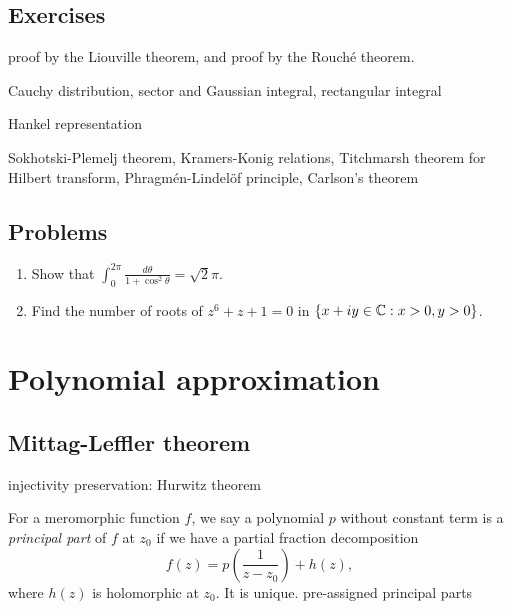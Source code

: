 \documentclass{../../large}
\begin{document}
\section*{Exercises}
\begin{prb}
proof by the Liouville theorem, and proof by the Rouch\'e theorem.
\end{prb}
\begin{prb}
Cauchy distribution,
sector and Gaussian integral,
rectangular integral
\end{prb}
\begin{prb}
\end{prb}
\begin{prb}
Hankel representation
\end{prb}
\begin{prb}
\end{prb}

Sokhotski-Plemelj theorem,
Kramers-Konig relations,
Titchmarsh theorem for Hilbert transform,
Phragm\'en-Lindel\"of principle,
Carlson's theorem

\section*{Problems}
\begin{enumerate}
\item Show that $\int_0^{2\pi}\frac{d\theta}{1+\cos^2\theta}=\sqrt2\pi$.
\item Find the number of roots of $z^6+z+1=0$ in $\{x+iy\in\mathbb{C}:x>0,y>0\}$.
\end{enumerate}




\chapter{Polynomial approximation}
\section{Mittag-Leffler theorem}
\begin{prb}
\begin{parts}
\item injectivity preservation: Hurwitz theorem
\end{parts}
\end{prb}

\begin{prb}
For a meromorphic function $f$, we say a polynomial $p$ without constant term is a \emph{principal part} of $f$ at $z_0$ if we have a partial fraction decomposition
\[f(z)=p\left(\frac1{z-z_0}\right)+h(z),\]
where $h(z)$ is holomorphic at $z_0$.
It is unique.
pre-assigned principal parts
\end{prb}
\end{document}
